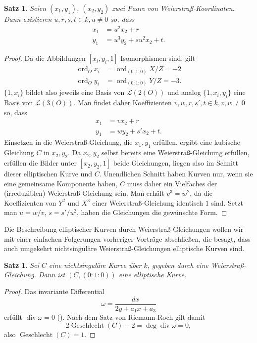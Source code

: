 \documentclass{amsart}
\theoremstyle{plain}
\newtheorem{proposition}[subsection]{Satz}
\theoremstyle{definition}
\newcommand{\divop}{\operatorname{div}}
\newcommand{\genus}{\operatorname{Geschlecht}}
\newcommand{\riemannspace}{\mathcal{L}}
\newcommand{\ord}{\operatorname{ord}}
\begin{document}
\begin{proposition}
	Seien $(x_1, y_1)$, $(x_2, y_2)$ zwei Paare von Weierstraß-Koordinaten.
	Dann existieren $u, r, s, t \in k, u \neq 0$ so, dass
	\begin{align*}
		x_1 & = u^2 x_2 + r \\
		y_1 & = u^3 y_2 + s u^2 x_2 + t.
	\end{align*}
\end{proposition}
\begin{proof}
	Da die Abbildungen $[x_i, y_i, 1]$ Isomorphismen sind, gilt
	\begin{align*}
		\ord_O x_i & = \ord_{(0 : 1 : 0)} X/Z = -2\\
		\ord_O y_i & = \ord_{(0 : 1 : 0)} Y/Z = -3.
	\end{align*}
	$\{1, x_i\}$ bildet also jeweils eine Basis von $\riemannspace(2(O))$ und analog $\{1, x_i, y_i\}$ eine Basis von $\riemannspace(3(O))$.
	Man findet daher Koeffizienten $v, w, r, s', t \in k, v, w \neq 0$ so, dass
	\begin{align*}
		x_1 & = v x_2 + r \\
		y_1 & = w y_2 + s' x_2 + t.
	\end{align*}
	Einsetzen in die Weierstraß-Gleichung, die $x_1, y_1$ erfüllen, ergibt eine kubische Gleichung $C$ in $x_2, y_2$.
	Da $x_2, y_2$ selbst bereits eine Weierstraß-Gleichung erfüllen, erfüllen die Bilder unter $[x_2, y_2, 1]$ beide Gleichungen, liegen also im Schnitt dieser elliptischen Kurve und $C$.
	Unendlichen Schnitt haben Kurven nur, wenn sie eine gemeinsame Komponente haben, $C$ muss daher ein Vielfaches der (irreduziblen) Weierstraß-Gleichung sein.
	Man erhält $v^3 = w^2$, da die Koeffizienten von $Y^2$ und $X^3$ einer Weierstraß-Gleichung identisch $1$ sind.
	Setzt man $u = w / v$, $s = s' / u^2$, haben die Gleichungen die gewünschte Form.
\end{proof}

Die Beschreibung elliptischer Kurven durch Weierstraß-Gleichungen wollen wir mit einer einfachen Folgerungen vorheriger Vorträge abschließen, die besagt, dass auch umgekehrt nichtsinguläre Weierstraß-Gleichungen elliptische Kurven sind.
\begin{proposition}
	Sei $C$ eine nichtsinguläre Kurve über $k$, gegeben durch eine Weierstraß-Gleichung.
	Dann ist $(C, (0 : 1 : 0))$ eine elliptische Kurve.
\end{proposition}
\begin{proof}
	Das invariante Differential
	\begin{equation*}
		\omega = \frac{dx}{2y + a_1x + a_3}
	\end{equation*}
	erfüllt $\divop \omega = 0$ (\cite[III. 1.5]{silverman}).
	Nach dem Satz von Riemann-Roch gilt damit
	\begin{equation*}
		2 \genus(C) - 2 = \deg \divop \omega = 0,
	\end{equation*}
	also $\genus(C) = 1$.
\end{proof}
\end{document}
